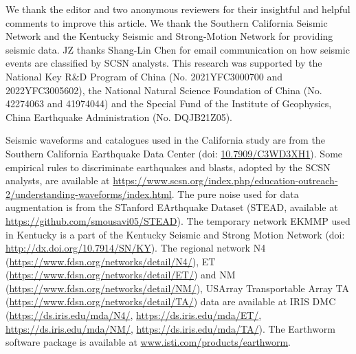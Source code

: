 \documentclass{gji}
\begin{document}
\begin{acknowledgments}
We thank the editor and two anonymous reviewers for their insightful and helpful comments to improve this article. We thank the Southern California Seismic Network and the Kentucky Seismic and Strong-Motion Network for providing seismic data. JZ thanks Shang-Lin Chen for email communication on how seismic events are classified by SCSN analysts. This research was supported by the National Key R\&D Program of China (No. 2021YFC3000700 and 2022YFC3005602), the National Natural Science Foundation of China (No. 42274063 and 41974044) and the Special Fund of the Institute of Geophysics, China Earthquake Administration (No. DQJB21Z05).
\end{acknowledgments}

\begin{dataavailability}
\label{data_avai}
Seismic waveforms and catalogues used in the California study are from the Southern California Earthquake Data Center (doi: \url{10.7909/C3WD3XH1}). Some empirical rules to discriminate earthquakes and blasts, adopted by the SCSN analysts, are available at \url{https://www.scsn.org/index.php/education-outreach-2/understanding-waveforms/index.html}. The pure noise used for data augmentation is from the STanford EArthquake Dataset (STEAD, available at \url{https://github.com/smousavi05/STEAD}). The temporary network EKMMP used in Kentucky is a part of the Kentucky Seismic and Strong Motion Network (doi: \url{http://dx.doi.org/10.7914/SN/KY}). The regional network N4 (\url{https://www.fdsn.org/networks/detail/N4/}), ET (\url{https://www.fdsn.org/networks/detail/ET/}) and NM (\url{https://www.fdsn.org/networks/detail/NM/}), USArray Transportable Array TA (\url{https://www.fdsn.org/networks/detail/TA/}) data are available at IRIS DMC (\url{https://ds.iris.edu/mda/N4/}, \url{https://ds.iris.edu/mda/ET/}, \url{https://ds.iris.edu/mda/NM/}, \url{https://ds.iris.edu/mda/TA/}). The Earthworm software package is available at \url{www.isti.com/products/earthworm}.
\end{dataavailability}



\end{document}
